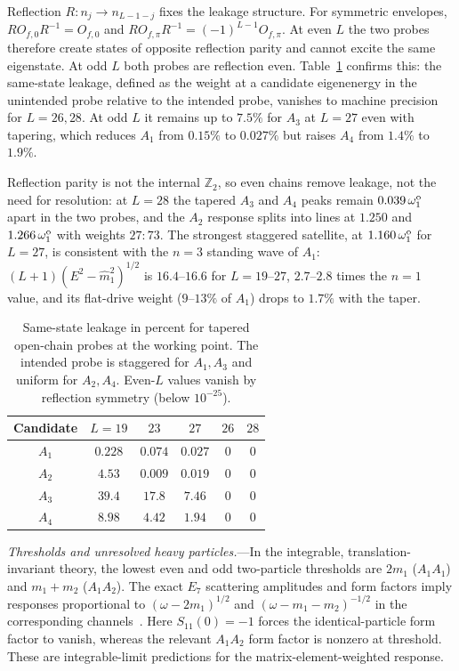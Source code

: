 \documentclass[aps,prl,twocolumn,superscriptaddress,showpacs,floatfix,10pt]{revtex4-2}
\begin{document}
Reflection $R:n_j\to n_{L-1-j}$ fixes the leakage structure. For symmetric
envelopes, $RO_{f,0}R^{-1}=O_{f,0}$ and $RO_{f,\pi}R^{-1}=(-1)^{L-1}O_{f,\pi}$.
At even $L$ the two probes therefore create states of opposite reflection parity
and cannot excite the same eigenstate. At odd $L$ both probes are reflection even.
Table~\ref{tab:leakage} confirms this: the same-state leakage, defined as the
weight at a candidate eigenenergy in the unintended probe relative to the intended
probe, vanishes to machine precision for $L=26,28$. At odd $L$ it remains up to
$7.5\%$ for $A_3$ at $L=27$ even with tapering, which reduces $A_1$ from
$0.15\%$ to $0.027\%$ but raises $A_4$ from $1.4\%$ to $1.9\%$.

Reflection parity is not the internal $\mathbb Z_2$, so even chains remove
leakage, not the need for resolution: at $L=28$ the tapered $A_3$ and $A_4$ peaks
remain $0.039\,\omega_1^{\rm o}$ apart in the two probes, and the $A_2$ response
splits into lines at $1.250$ and $1.266\,\omega_1^{\rm o}$ with weights $27:73$.
The strongest staggered satellite, at $1.160\,\omega_1^{\rm o}$ for $L=27$, is
consistent with the $n=3$ standing wave of $A_1$: $(L+1)(E^2-\widehat m_1^2)^{1/2}$
is $16.4$--$16.6$ for $L=19$--$27$, $2.7$--$2.8$ times the $n=1$ value, and its
flat-drive weight ($9$--$13\%$ of $A_1$) drops to $1.7\%$ with the taper.

\begin{table}[htbp]
\caption{Same-state leakage in percent for tapered open-chain probes at the
working point. The intended probe is staggered for $A_1,A_3$ and uniform for
$A_2,A_4$. Even-$L$ values vanish by reflection symmetry (below $10^{-25}$).}
\label{tab:leakage}
\begin{ruledtabular}
\begin{tabular}{cccccc}
Candidate & $L=19$ & $23$ & $27$ & $26$ & $28$ \\
\hline
$A_1$ & $0.228$ & $0.074$ & $0.027$ & $0$ & $0$ \\
$A_2$ & $4.53$ & $0.009$ & $0.019$ & $0$ & $0$ \\
$A_3$ & $39.4$ & $17.8$ & $7.46$ & $0$ & $0$ \\
$A_4$ & $8.98$ & $4.42$ & $1.94$ & $0$ & $0$
\end{tabular}
\end{ruledtabular}
\end{table}

\emph{Thresholds and unresolved heavy particles.}---In the integrable,
translation-invariant theory, the lowest even and odd two-particle thresholds
are $2m_1$ ($A_1A_1$) and $m_1+m_2$ ($A_1A_2$). The exact $E_7$ scattering
amplitudes and form factors imply responses proportional to
$(\omega-2m_1)^{1/2}$ and $(\omega-m_1-m_2)^{-1/2}$ in the corresponding
channels~\cite{CortesCubero2022}. Here $S_{11}(0)=-1$ forces the identical-particle
form factor to vanish, whereas the relevant $A_1A_2$ form factor is nonzero at
threshold. These are integrable-limit predictions for the matrix-element-weighted response.
\end{document}
